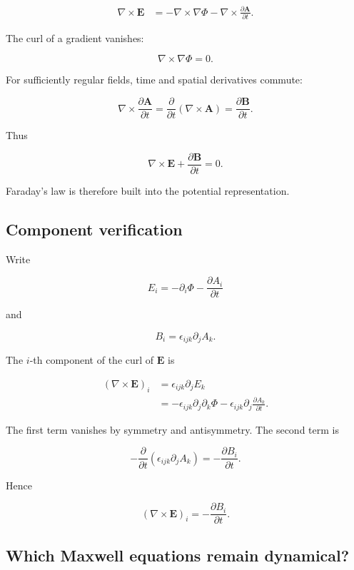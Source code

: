 \[
\begin{aligned}
\nabla\times\mathbf{E}
&=
-\nabla\times\nabla\Phi
-
\nabla\times
\frac{\partial\mathbf{A}}{\partial t}.
\end{aligned}
\]

The curl of a gradient vanishes:

\[
\nabla\times\nabla\Phi=0.
\]

For sufficiently regular fields, time and spatial derivatives commute:

\[
\nabla\times
\frac{\partial\mathbf{A}}{\partial t}
=
\frac{\partial}{\partial t}
\left(
\nabla\times\mathbf{A}
\right)
=
\frac{\partial\mathbf{B}}{\partial t}.
\]

Thus

\[
\boxed{
\nabla\times\mathbf{E}
+
\frac{\partial\mathbf{B}}{\partial t}
=0
}.
\]

Faraday's law is therefore built into the potential representation.

\subsection{Component verification}

Write

\[
E_i
=
-\partial_i\Phi
-
\frac{\partial A_i}{\partial t}
\]

and

\[
B_i
=
\epsilon_{ijk}\partial_jA_k.
\]

The \(i\)-th component of the curl of \(\mathbf{E}\) is

\[
\begin{aligned}
(\nabla\times\mathbf{E})_i
&=
\epsilon_{ijk}\partial_jE_k\\
&=
-\epsilon_{ijk}
\partial_j\partial_k\Phi
-
\epsilon_{ijk}
\partial_j
\frac{\partial A_k}{\partial t}.
\end{aligned}
\]

The first term vanishes by symmetry and antisymmetry. The second term is

\[
-
\frac{\partial}{\partial t}
\left(
\epsilon_{ijk}\partial_jA_k
\right)
=
-
\frac{\partial B_i}{\partial t}.
\]

Hence

\[
(\nabla\times\mathbf{E})_i
=
-
\frac{\partial B_i}{\partial t}.
\]

\subsection{Which Maxwell equations remain dynamical?}

